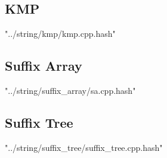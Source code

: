 \documentclass [a4paper,5pt,oneside, landscape]{article}
\begin{document}
\begin{multicols}{3}
\subsection{ KMP}
 {"../string/kmp/kmp.cpp.hash"}


\subsection{ Suffix Array}
 {"../string/suffix_array/sa.cpp.hash"}


\subsection{ Suffix Tree}
 {"../string/suffix_tree/suffix_tree.cpp.hash"}

\end{multicols}
\end{document}
